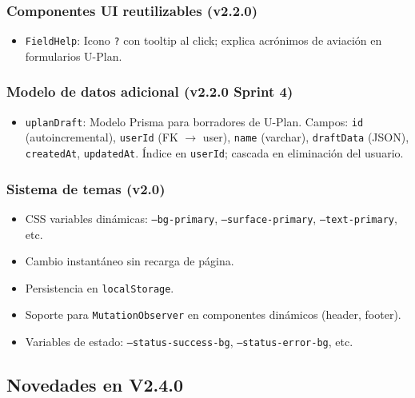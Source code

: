 \documentclass[12pt,a4paper]{article}
\begin{document}
\subsubsection*{Componentes UI reutilizables (v2.2.0)}
\begin{itemize}
    \item \texttt{FieldHelp}: Icono \texttt{?} con tooltip al click; explica acrónimos de aviación en formularios U-Plan.
\end{itemize}

\subsubsection*{Modelo de datos adicional (v2.2.0 Sprint 4)}
\begin{itemize}
    \item \texttt{uplanDraft}: Modelo Prisma para borradores de U-Plan. Campos: \texttt{id} (autoincremental), \texttt{userId} (FK $\rightarrow$ user), \texttt{name} (varchar), \texttt{draftData} (JSON), \texttt{createdAt}, \texttt{updatedAt}. Índice en \texttt{userId}; cascada en eliminación del usuario.
\end{itemize}

\subsubsection*{Sistema de temas (v2.0)}
\begin{itemize}
    \item CSS variables dinámicas: \texttt{--bg-primary}, \texttt{--surface-primary}, \texttt{--text-primary}, etc.
    \item Cambio instantáneo sin recarga de página.
    \item Persistencia en \texttt{localStorage}.
    \item Soporte para \texttt{MutationObserver} en componentes dinámicos (header, footer).
    \item Variables de estado: \texttt{--status-success-bg}, \texttt{--status-error-bg}, etc.
\end{itemize}


\subsection*{Novedades en V2.4.0}
\end{document}
